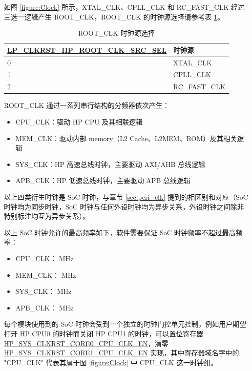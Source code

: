 \documentclass[main\_\_CN.tex]{subfiles}
\begin{document}
如图 \ref{figure:Clock} 所示，XTAL\_CLK、CPLL\_CLK 和 RC\_FAST\_CLK 经过三选一逻辑产生 ROOT\_CLK，ROOT\_CLK 的时钟源选择请参考表 \ref{tab:resclk-cpu-clk-src}。

\begin{longtable}[c]{|l|l| }
       \caption{ROOT\_CLK 时钟源选择}
		\label{tab:resclk-cpu-clk-src} \\
	    \hline

        \rowcolor{lightgray}
        \textbf{\hyperref[fielddesc:LPCLKRSTHPROOTCLKSRCSEL]{LP\_CLKRST\_HP\_ROOT\_CLK\_SRC\_SEL}} & \textbf{时钟源} \\

        \hline
        0 & XTAL\_CLK \\
        \hline
        1 & CPLL\_CLK \\
        \hline
        2 & RC\_FAST\_CLK \\
        \hline
\end{longtable}

ROOT\_CLK 通过一系列串行结构的分频器依次产生：
\begin{itemize}
    \item CPU\_CLK：驱动 HP CPU 及其相联逻辑
    \item MEM\_CLK：驱动内部 memory（L2 Cache、L2MEM、ROM）及其相关逻辑
    \item SYS\_CLK：HP 高速总线时钟，主要驱动 AXI/AHB 总线逻辑
    \item APB\_CLK：HP 低速总线时钟，主要驱动 APB 总线逻辑
\end{itemize}

以上四类衍生时钟是 SoC 时钟，与章节 \ref{sec:peri_clk} \textit{} 提到的相区别和对应（SoC 时钟均为同步时钟，SoC 时钟与任何外设时钟均为异步关系，外设时钟之间除非特别标注均互为异步关系）。

以上 SoC 时钟允许的最高频率如下，软件需要保证 SoC 时钟频率不超过最高频率：
\begin{itemize}
    \item CPU\_CLK： MHz
    \item MEM\_CLK： MHz
    \item SYS\_CLK： MHz
    \item APB\_CLK： MHz
\end{itemize}





每个模块使用到的 SoC 时钟会受到一个独立的时钟门控单元控制，例如用户期望打开 HP CPU0 的时钟而关闭 HP CPU1 的时钟，可以置位寄存器 \hyperref[fielddesc:HPSYSCLKRSTCORE0CPUCLKEN]{HP\_SYS\_CLKRST\_CORE0\_CPU\_CLK\_EN}，清零 \hyperref[fielddesc:HPSYSCLKRSTCORE1CPUCLKEN]{HP\_SYS\_CLKRST\_CORE1\_CPU\_CLK\_EN} 实现，其中寄存器域名字中的 "CPU\_CLK" 代表其属于图 \ref{figure:Clock} 中 CPU\_CLK 这一时钟组。
\end{document}
